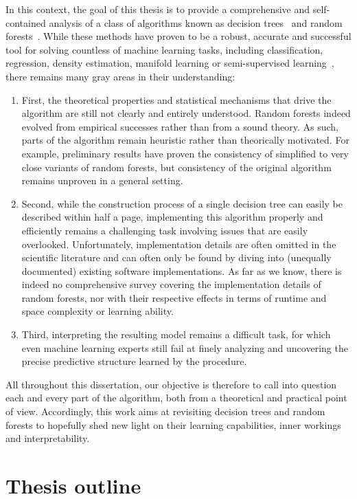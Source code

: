 In this context, the goal of this thesis is to provide a comprehensive and self-contained analysis
of a class of algorithms known as decision trees~\citep{breiman:1984} and
random forests~\citep{breiman:2001}. While these
methods have proven to be a robust, accurate and successful tool for solving
countless of machine learning tasks, including classification, regression,
density estimation, manifold learning or semi-supervised
learning~\citep{criminisi:2013}, there remains many gray areas in their
understanding:
\begin{enumerate}
\item First, the theoretical properties and statistical mechanisms that drive
the algorithm are still not clearly and entirely understood. Random forests
indeed evolved from empirical successes rather than from a sound
theory. As such, parts of the algorithm remain heuristic rather than
theorically motivated. For example, preliminary
results have proven the consistency of simplified to very close variants of
random forests, but consistency of the original algorithm remains unproven
in a general setting.
\item Second, while the construction process of a single decision tree can
easily be described within half a page, implementing this algorithm properly
and efficiently remains a challenging task involving issues that are easily
overlooked. Unfortunately, implementation details are often omitted in the
scientific literature and can often only be found by diving into
(unequally documented) existing software implementations. As far as we know,
there is indeed no comprehensive survey covering the implementation details of
random forests, nor with their respective effects in terms of runtime and space
complexity or learning ability.
\item Third, interpreting the resulting model remains a difficult task,
for which even machine learning experts still fail at finely analyzing and
uncovering the precise predictive structure learned by the procedure.
\end{enumerate}
All throughout this dissertation, our objective is therefore
to call into question each and every part of the algorithm,  both from a theoretical and practical point of view.
Accordingly, this work aims at revisiting decision trees and random forests to
hopefully shed new light on their learning capabilities, inner workings and
interpretability.

\section{Thesis outline}

